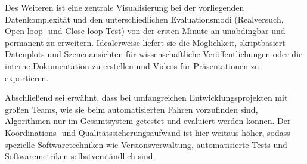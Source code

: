 Des Weiteren ist eine zentrale Visualisierung bei der \iA vorliegenden Datenkomplexität und den unterschiedlichen Evaluationsmodi (Realversuch, Open-loop- und Close-loop-Test) von der ersten Minute an unabdingbar und permanent zu erweitern. Idealerweise liefert sie die Möglichkeit, skriptbasiert Datenplots und Szenenansichten für wissenschaftliche Veröffentlichungen oder die interne Dokumentation zu erstellen und Videos für Präsentationen zu exportieren.

Abschließend sei erwähnt, dass bei umfangreichen Entwicklungsprojekten mit großen Teams, wie sie beim automatisierten Fahren vorzufinden sind, Algorithmen nur im Gesamtsystem getestet und evaluiert werden können. Der Koordinations- und Qualitätssicherungsaufwand ist hier weitaus höher, sodass spezielle Softwaretechniken wie Versionsverwaltung, automatisierte Tests und Softwaremetriken selbstverständlich sind.

